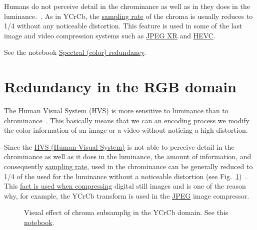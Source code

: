 Humans do not perceive detail in the chrominance as well as in they
does in the
luminance.~\cite{burger2016digital}. As in
$\text{YCrCb}$, the
\href{https://en.wikipedia.org/wiki/Sampling_(signal_processing)}{sampling
  rate} of the chroma is usually reduces to 1/4 without any noticeable
distortion. This feature is used in some of the last image and video
compression systems such as
\href{https://en.wikipedia.org/wiki/JPEG_XR#Description}{JPEG XR} and
\href{https://en.wikipedia.org/wiki/High_Efficiency_Video_Coding#Video_coding_layer}{HEVC}.

See the notebook
\href{https://github.com/vicente-gonzalez-ruiz/color_transforms/blob/main/docs/color_redundancy.ipynb}{Spectral
  (color) redundancy}.

\section{Redundancy in the RGB domain}

The Human Visual System (HVS) is more sensitive to luminance than to
chrominance~\cite{vruiz__visual_redundancy}. This basically means that
we can an encoding process we modify the color information of an image
or a video without noticing a high distortion.

Since the \href{https://en.wikipedia.org/wiki/Visual_system}{HVS
  (Human Visual System)} is not able to perceive detail in the
chrominance as well as it does in the luminance, the amount of
information, and consequently
\href{https://en.wikipedia.org/wiki/Sampling_(signal_processing)}{sampling
  rate}, used in the chrominance can be generally reduced to 1/4 of
the used for the luminance without a noticeable distortion (see
Fig.~\ref{fig:san-diego_chroma_subsampled})~\cite{burger2016digital}. This
\href{https://en.wikipedia.org/wiki/Bandwidth_(computing)}{fact is
  used when compressing} digital still images and is one of the reason
why, for example, the $\text{YCrCb}$ transform is used in the
\href{https://en.wikipedia.org/wiki/JPEG}{JPEG} image compressor.


\begin{figure}
  \centering
  \caption{Visual effect of chroma subsamplig in the YCrCb domain. See
    this
    \href{https://github.com/Sistemas-Multimedia/Sistemas-Multimedia.github.io/blob/master/milestones/06-YUV_compression/chroma_subsampling.ipynb}{notebook}.}
  \label{fig:san-diego_chroma_subsampled}
\end{figure}

